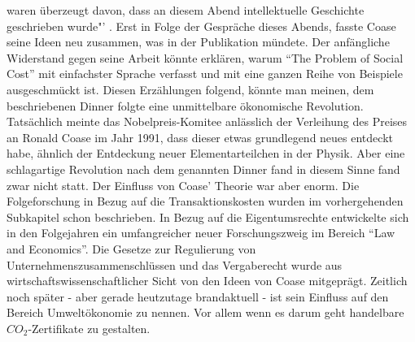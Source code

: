 waren überzeugt davon, dass an diesem Abend intellektuelle Geschichte geschrieben wurde"' \parencite[S. 115]{Warsh}. Erst in Folge der Gespräche dieses Abends, fasste Coase seine Ideen neu zusammen, was in der Publikation \textcite{Coase1960} mündete. Der anfängliche Widerstand gegen seine Arbeit könnte erklären, warum "`The Problem of Social Cost"' mit einfachster Sprache verfasst und mit eine ganzen Reihe von Beispiele ausgeschmückt ist. Diesen Erzählungen folgend, könnte man meinen, dem beschriebenen Dinner folgte eine unmittelbare ökonomische Revolution. Tatsächlich meinte das Nobelpreis-Komitee anlässlich der Verleihung des Preises an Ronald Coase im Jahr 1991, dass dieser etwas grundlegend neues entdeckt habe, ähnlich der Entdeckung neuer Elementarteilchen in der Physik. Aber eine schlagartige Revolution nach dem genannten Dinner fand in diesem Sinne fand zwar nicht statt. Der Einfluss von Coase' Theorie war aber enorm. Die Folgeforschung in Bezug auf die Transaktionskosten wurden im vorhergehenden Subkapitel schon beschrieben. In Bezug auf die Eigentumsrechte entwickelte sich in den Folgejahren ein umfangreicher neuer Forschungszweig im Bereich "`Law and Economics"'. Die Gesetze zur Regulierung von Unternehmenszusammenschlüssen und das Vergaberecht wurde aus wirtschaftswissenschaftlicher Sicht von den Ideen von Coase mitgeprägt. Zeitlich noch später - aber gerade heutzutage brandaktuell - ist sein Einfluss auf den Bereich Umweltökonomie zu nennen. Vor allem wenn es darum geht handelbare $CO_2$-Zertifikate zu gestalten. 

